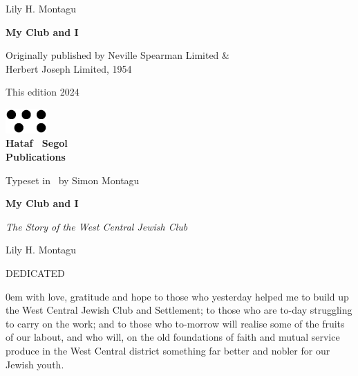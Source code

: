 \frontmatter
\pagestyle{empty}

\vspace*{2\baselineskip}
\begin{center}
  Lily H. Montagu

  \vspace*{2\baselineskip}
  \textbf{My Club and I}
\end{center}

\clearpage

\begin{center}
  \vspace*{2\baselineskip}
  
  \small Originally published by Neville Spearman Limited \&\\
  Herbert Joseph Limited, 1954

  This edition 2024
  \vspace*{22\baselineskip}

  \includegraphics[width=16mm]{hatafSegolLogoNoText.png}\\
  
  {
    \Large\bfseries Hataf \ Segol\\Publications
  }

  \vspace{1\baselineskip}
  \small
  Typeset in \XeLaTeX\ by Simon Montagu
  \end{center}

\clearpage
 
{
  \vspace*{4\baselineskip}

  \centering\Huge\textbf{My Club and I}

  \large\textsl{The Story of the West Central Jewish Club}

  \vspace{2\baselineskip}

  \Large Lily H. Montagu
  
}

\cleardoublepage
\vspace*{10em}

{\centering
  \large DEDICATED

}
{\parindent 0em
with love, gratitude and hope to those who yesterday helped me to build up the West Central Jewish Club and Settlement; to those who are to-day struggling to carry on the work; and to those who to-morrow will realise some of the fruits of our labout, and who will, on the old foundations of faith and mutual service produce in the West Central district something far better and nobler for our Jewish youth.
}


